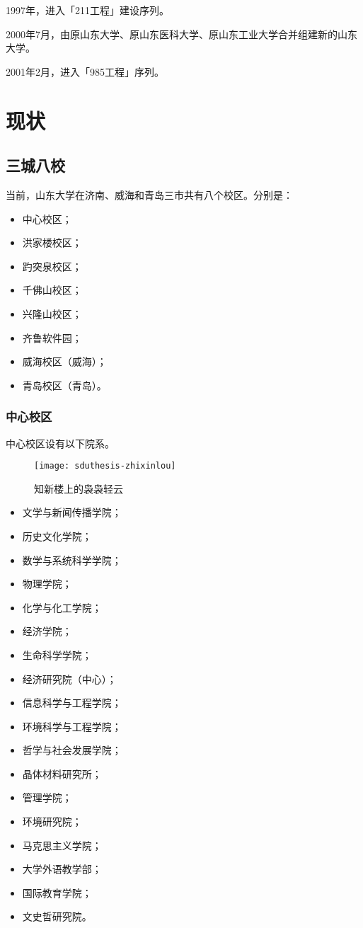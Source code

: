 \documentclass[openany]{sduthesis} %
\begin{document}
1997年，进入「211工程」建设序列。

2000年7月，由原山东大学、原山东医科大学、原山东工业大学合并组建新的山东大学。

2001年2月，进入「985工程」序列。

\chapter{现状}

\section{三城八校}

当前，山东大学在济南、威海和青岛三市共有八个校区。分别是：

\begin{itemize}
  \item 中心校区；
  \item 洪家楼校区；
  \item 趵突泉校区；
  \item 千佛山校区；
  \item 兴隆山校区；
  \item 齐鲁软件园；
  \item 威海校区（威海）；
  \item 青岛校区（青岛）。
\end{itemize}

\subsection{中心校区}

中心校区设有以下院系。
\begin{figure}[!htb]
\centering
\texttt{[image: sduthesis-zhixinlou]}
\caption{知新楼上的袅袅轻云}\label{fig:zhixinlou}
\end{figure}
\begin{itemize}
  \item 文学与新闻传播学院；
  \item 历史文化学院；
  \item 数学与系统科学学院；
  \item 物理学院；
  \item 化学与化工学院；
  \item 经济学院；
  \item 生命科学学院；
  \item 经济研究院（中心）；
  \item 信息科学与工程学院；
  \item 环境科学与工程学院；
  \item 哲学与社会发展学院；
  \item 晶体材料研究所；
  \item 管理学院；
  \item 环境研究院；
  \item 马克思主义学院；
  \item 大学外语教学部；
  \item 国际教育学院；
  \item 文史哲研究院。
\end{itemize}
\end{document}

